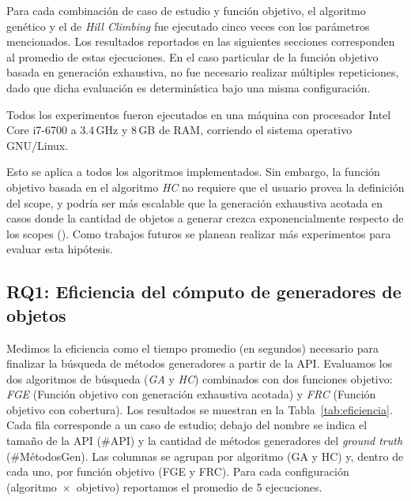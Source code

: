 Para cada combinación de caso de estudio y función objetivo, el algoritmo
genético y el de \emph{Hill Climbing} fue ejecutado cinco veces con los parámetros mencionados. Los
resultados reportados en las siguientes secciones corresponden al promedio de
estas ejecuciones. En el caso particular de la función objetivo basada en
generación exhaustiva, no fue necesario realizar múltiples repeticiones, dado
que dicha evaluación es determinística bajo una misma configuración.

Todos los experimentos fueron ejecutados en una máquina con procesador Intel
Core i7-6700 a 3.4\,GHz y 8\,GB de RAM, corriendo el sistema operativo
GNU/Linux.


%

Esto se aplica a todos los algoritmos implementados.
Sin embargo, la función objetivo basada en el algoritmo \emph{HC} no requiere que el usuario provea la definición del scope, y
podría ser más escalable que la generación exhaustiva acotada en casos donde
la cantidad de objetos a generar crezca exponencialmente respecto de los scopes 
(). Como trabajos futuros se planean realizar más experimentos 
para evaluar esta hipótesis.


\subsection{RQ1: Eficiencia del cómputo de generadores de objetos}
Medimos la eficiencia como el tiempo promedio (en segundos) necesario para
finalizar la búsqueda de métodos generadores a partir de la API. Evaluamos los dos
algoritmos de búsqueda (\emph{GA} y \emph{HC}) combinados con dos funciones
objetivo: \emph{FGE} (Función objetivo con generación exhaustiva acotada) y \emph{FRC} (Función objetivo con cobertura). 
Los resultados se muestran en la Tabla~\ref{tab:eficiencia}. Cada fila
corresponde a un caso de estudio; debajo del nombre se indica el tamaño de la API
(\#API) y la cantidad de métodos generadores del \emph{ground truth}
(\#MétodosGen). Las columnas se agrupan por algoritmo (GA y HC) y, dentro de
cada uno, por función objetivo (FGE y FRC). Para cada configuración
(algoritmo~$\times$~objetivo) reportamos el promedio de 5 ejecuciones.

